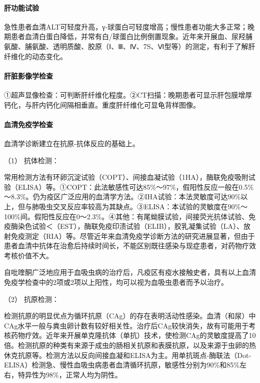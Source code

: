 \paragraph{肝功能试验}

急性患者血清ALT可轻度升高，γ-球蛋白可轻度增高；慢性患者功能大多正常；晚期患者血清白蛋白降低，并常有白/球蛋白比例倒置现象。近年来开展血、尿羟脯氨酸、脯氨酸、透明质酸、胶原（Ⅰ、Ⅲ、Ⅳ、7S、Ⅵ型等）的测定，有利于了解肝纤维化的动态变化。

\paragraph{肝脏影像学检查}

①超声显像检查：可判断肝纤维化程度。②CT扫描：晚期患者可显示肝包膜增厚钙化，与肝内钙化间隔相垂直。重度肝纤维化可显龟背样图像。

\paragraph{血清免疫学检查}

血清学诊断建立在抗原-抗体反应的基础上。

\hypertarget{text00239.htmlux5cux23CHP7-15-2-2-4-1}{}
（1） 抗体检测：

常用检测方法有环卵沉淀试验（COPT）、间接血凝试验（1HA），酶联免疫吸附试验（ELISA）等。①COPT：此法敏感性可达85\%～97\%，假阳性反应一般在0.5\%～8.3\%。仍为疫区广泛应用的血清学方法。②IHA试验：本法灵敏度可达90\%以上，但与肺吸虫交叉反应率较高为其缺点。③ELISA：本试验的灵敏度在90\%～100\%间。假阳性反应在0～2.3\%。④其他：有尾蚴膜试验，间接荧光抗体试验、免疫酶染色试验＜（EST），酶联免疫印渍试验（ELIB），胶乳凝集试验（LA）、放射免疫测定（RIA）等。尽管近年来血清免疫学诊断方法的研究进展显著，但由于患者血清中抗体在治愈后持续时间长，不能区别既往感染与现症患者，对药物疗效考核价值不大。

自吡喹酮广泛地应用于血吸虫病的治疗后，凡疫区有疫水接触史者，具有以上血清免疫学检查中的2项或2项以上阳性，均可以视为血吸虫患者而予以治疗。

\hypertarget{text00239.htmlux5cux23CHP7-15-2-2-4-2}{}
（2） 抗原检测：

检测抗原的明显优点为循环抗原（CAg）的存在表明活动性感染。血清（和尿）中CAg水平一般与粪虫卵计数有较好相关性。治疗后CAg较快消失，故有可能用于考核药物疗效。近年来开展单克隆抗体（单抗）技术，使检测CAg的灵敏度提高了10倍。检测抗原的种类有来源于成虫的肠相关抗原和表膜抗原，以及来源于虫卵的热休克抗原等。检测方法以反向间接血凝和ELISA为主。用单抗斑点-酶联法（Dot-ELISA）检测急、慢性血吸虫病患者血清循环抗原，敏感性分别为90\%和85\%左右，特异性为98\%，正常人均为阴性。

